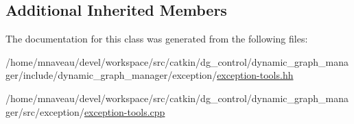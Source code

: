 \subsection*{Additional Inherited Members}


The documentation for this class was generated from the following files\+:\begin{DoxyCompactItemize}
\item 
/home/mnaveau/devel/workspace/src/catkin/dg\+\_\+control/dynamic\+\_\+graph\+\_\+manager/include/dynamic\+\_\+graph\+\_\+manager/exception/\hyperlink{exception-tools_8hh}{exception-\/tools.\+hh}\item 
/home/mnaveau/devel/workspace/src/catkin/dg\+\_\+control/dynamic\+\_\+graph\+\_\+manager/src/exception/\hyperlink{exception-tools_8cpp}{exception-\/tools.\+cpp}\end{DoxyCompactItemize}
